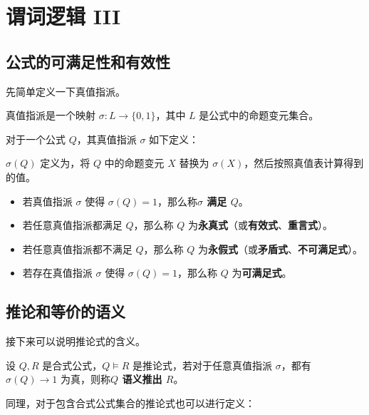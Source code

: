 \section{谓词逻辑 III}

\subsection{公式的可满足性和有效性}

先简单定义一下真值指派。

\begin{definition}
    真值指派是一个映射 $\sigma: L \to \{0, 1\}$，其中 $L$ 是公式中的命题变元集合。
\end{definition}

对于一个公式 $Q$，其真值指派 $\sigma$ 如下定义：

\begin{definition}
    $\sigma(Q)$ 定义为，将 $Q$ 中的命题变元 $X$ 替换为 $\sigma(X)$，然后按照真值表计算得到的值。
\end{definition}

\begin{definition}
    \begin{itemize}
        \item 若真值指派 $\sigma$ 使得 $\sigma(Q) = 1$，那么称\textbf{$\sigma$ 满足 $Q$}。
        \item 若任意真值指派都满足 $Q$，那么称 $Q$ 为\textbf{永真式}（或\textbf{有效式}、\textbf{重言式}）。
        \item 若任意真值指派都不满足 $Q$，那么称 $Q$ 为\textbf{永假式}（或\textbf{矛盾式}、\textbf{不可满足式}）。
        \item 若存在真值指派 $\sigma$ 使得 $\sigma(Q) = 1$，那么称 $Q$ 为\textbf{可满足式}。
    \end{itemize}
\end{definition}

\subsection{推论和等价的语义}

接下来可以说明推论式的含义。

\begin{definition}
    设 $Q, R$ 是合式公式，$Q \models R$ 是推论式，若对于任意真值指派 $\sigma$，都有 $\sigma(Q) \to 1$ 为真，则称\textbf{$Q$ 语义推出 $R$}。
\end{definition}

同理，对于包含合式公式集合的推论式也可以进行定义：

